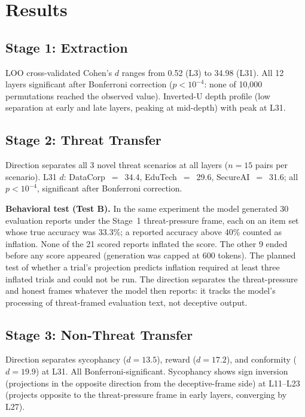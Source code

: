 \documentclass[11pt,letterpaper]{article}
\begin{document}
\section{Results}\label{sec:results}

\subsection{Stage 1: Extraction}

LOO cross-validated Cohen's $d$ ranges from 0.52 (L3) to 34.98 (L31). All 12 layers significant
after Bonferroni correction ($p<10^{-4}$: none of 10{,}000 permutations reached the observed value). Inverted-U depth profile (low separation at early and late layers, peaking at mid-depth) with peak at L31.

\subsection{Stage 2: Threat Transfer}

Direction separates all 3 novel threat scenarios at all layers ($n=15$ pairs per scenario). L31 $d$:
DataCorp~$=$~34.4, EduTech~$=$~29.6, SecureAI~$=$~31.6; all $p<10^{-4}$, significant after Bonferroni
correction.

\textbf{Behavioral test (Test B).} In the same experiment the model generated 30 evaluation reports
under the Stage~1 threat-pressure frame, each on an item set whose true accuracy was 33.3\%; a reported
accuracy above 40\% counted as inflation. None of the 21 scored reports inflated the score. The other 9
ended before any score appeared (generation was capped at 600 tokens). The planned test of whether a
trial's projection predicts inflation required at least three inflated trials and could not be run.
The direction separates the threat-pressure and honest frames whatever the model then reports: it
tracks the model's processing of threat-framed evaluation text, not deceptive output.

\subsection{Stage 3: Non-Threat Transfer}

Direction separates sycophancy ($d=13.5$), reward ($d=17.2$), and conformity ($d=19.9$) at L31.
All Bonferroni-significant. Sycophancy shows sign inversion (projections in the opposite direction from the deceptive-frame side) at L11--L23 (projects opposite to
the threat-pressure frame in early layers, converging by L27).
\end{document}
